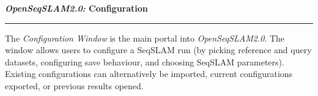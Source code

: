 \centerline{\textbf{\textit{OpenSeqSLAM2.0:} Configuration}}
\noindent\rule{\textwidth}{2pt}
\bigskip
\parbox{\textwidth}{The \textit{Configuration Window} is the main portal into \textit{OpenSeqSLAM2.0}. The window allows users to configure a SeqSLAM run (by picking reference and query datasets, configuring save behaviour, and choosing SeqSLAM parameters). Existing configurations can alternatively be imported, current configurations exported, or previous results opened.}
\bigskip
